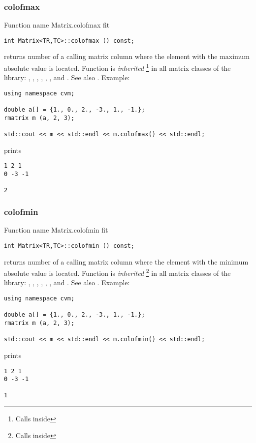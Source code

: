 \subsubsection{colofmax}
Function%
\pdfdest name {Matrix.colofmax} fit
\begin{verbatim}
int Matrix<TR,TC>::colofmax () const;
\end{verbatim}
returns  \Based number of a calling matrix column 
where the element with the maximum absolute value is located.
Function is \emph{inherited}%
\footnote{Calls  inside}
in all matrix classes
of the library:
,   ,
, ,
, ,
 and .
See also .
Example:
\begin{Verbatim}
using namespace cvm;

double a[] = {1., 0., 2., -3., 1., -1.};
rmatrix m (a, 2, 3);

std::cout << m << std::endl << m.colofmax() << std::endl;
\end{Verbatim}
prints
\begin{Verbatim}
1 2 1
0 -3 -1

2
\end{Verbatim}
\newpage



\subsubsection{colofmin}
Function%
\pdfdest name {Matrix.colofmin} fit
\begin{verbatim}
int Matrix<TR,TC>::colofmin () const;
\end{verbatim}
returns  \Based number of a calling matrix column 
where the element with the minimum absolute value is located.
Function is \emph{inherited}%
\footnote{Calls  inside}
in all matrix classes
of the library:
,   ,
, ,
, ,
 and .
See also .
Example:
\begin{Verbatim}
using namespace cvm;

double a[] = {1., 0., 2., -3., 1., -1.};
rmatrix m (a, 2, 3);

std::cout << m << std::endl << m.colofmin() << std::endl;
\end{Verbatim}
prints
\begin{Verbatim}
1 2 1
0 -3 -1

1
\end{Verbatim}
\newpage




